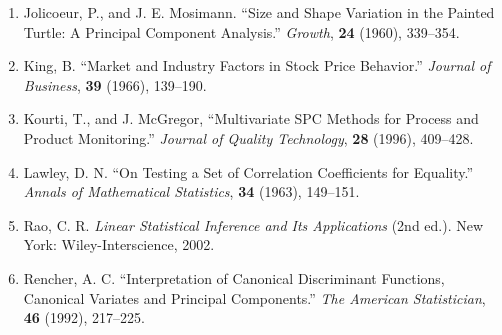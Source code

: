 \begin{enumerate}[label=\arabic*.,leftmargin=2em,itemsep=4pt]
\item Jolicoeur, P., and J. E. Mosimann. ``Size and Shape Variation in the Painted Turtle: A Principal Component Analysis.'' \textit{Growth}, \textbf{24} (1960), 339--354.
\item King, B. ``Market and Industry Factors in Stock Price Behavior.'' \textit{Journal of Business}, \textbf{39} (1966), 139--190.
\item Kourti, T., and J. McGregor, ``Multivariate SPC Methods for Process and Product Monitoring.'' \textit{Journal of Quality Technology}, \textbf{28} (1996), 409--428.
\item Lawley, D. N. ``On Testing a Set of Correlation Coefficients for Equality.'' \textit{Annals of Mathematical Statistics}, \textbf{34} (1963), 149--151.
\item Rao, C. R. \textit{Linear Statistical Inference and Its Applications} (2nd ed.). New York: Wiley-Interscience, 2002.
\item Rencher, A. C. ``Interpretation of Canonical Discriminant Functions, Canonical Variates and Principal Components.'' \textit{The American Statistician}, \textbf{46} (1992), 217--225.
\end{enumerate}
